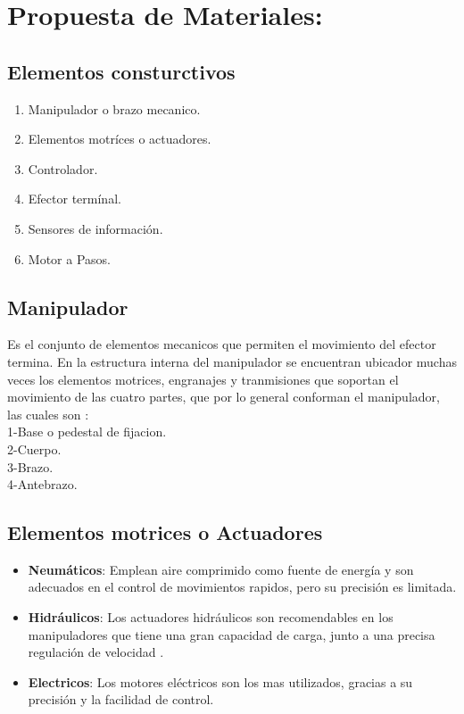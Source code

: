 \documentclass[14pt,a4paper]{article}
\begin{document}
\section{Propuesta de Materiales:}

\subsection{Elementos consturctivos}
\begin{enumerate}
\item Manipulador o brazo mecanico.
\item Elementos motríces o actuadores.
\item Controlador.
\item Efector termínal.
\item Sensores de información.
\item Motor a Pasos.
\end{enumerate}

\subsection{Manipulador}
Es el conjunto de elementos mecanicos que permiten el movimiento del efector termina. En la estructura interna del manipulador se encuentran ubicador muchas veces los elementos motrices, engranajes y tranmisiones que soportan el movimiento de las cuatro partes, que por lo general conforman el manipulador, las cuales son \citep{puglisi2006protesis}:\\
1-Base o pedestal de fijacion.\\
2-Cuerpo.\\
3-Brazo.\\
4-Antebrazo.\\
\subsection{Elementos motrices o Actuadores}

\begin{itemize}
\item \textbf{Neumáticos}:
Emplean aire comprimido como fuente de energía y son adecuados en el control de movimientos rapidos, pero su precisión es limitada.\\
\item \textbf{Hidráulicos}:
Los actuadores hidráulicos son recomendables en los manipuladores que tiene una gran capacidad de carga, junto a una precisa regulación de velocidad \citep{turiel2002aplicaciones} .\\
\item \textbf{Electricos}:
Los motores eléctricos son los mas utilizados, gracias a su precisión y la facilidad de control.
\end{itemize}
\end{document}
